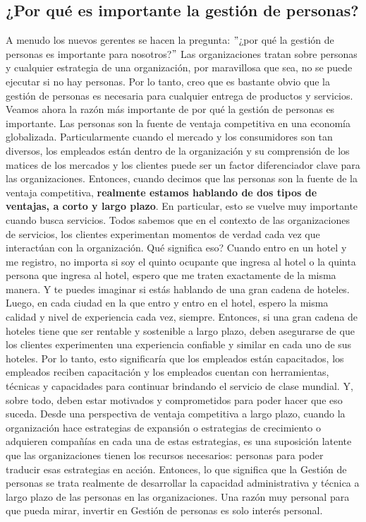 \documentclass[10pt]{book}
\begin{document}
\subsection{¿Por qué es importante la gestión de personas?}
A menudo los nuevos gerentes se hacen la pregunta: $"$¿por qué la gestión de personas es importante para nosotros?$"$ Las organizaciones tratan sobre personas y cualquier estrategia de una organización, por maravillosa que sea, no se puede ejecutar si no hay personas. Por lo tanto, creo que es bastante obvio que la gestión de personas es necesaria para cualquier entrega de productos y servicios.\\
Veamos ahora la razón más importante de por qué la gestión de personas es importante. Las personas son la fuente de ventaja competitiva en una economía globalizada. Particularmente cuando el mercado y los consumidores son tan diversos, los empleados están dentro de la organización y su comprensión de los matices de los mercados y los clientes puede ser un factor diferenciador clave para las organizaciones. Entonces, cuando decimos que las personas son la fuente de la ventaja competitiva, \textbf{realmente estamos hablando de dos tipos de ventajas, a corto y largo plazo}. En particular, esto se vuelve muy importante cuando busca servicios. Todos sabemos que en el contexto de las organizaciones de servicios, los clientes experimentan momentos de verdad cada vez que interactúan con la organización. Qué significa eso? Cuando entro en un hotel y me registro, no importa si soy el quinto ocupante que ingresa al hotel o la quinta persona que ingresa al hotel, espero que me traten exactamente de la misma manera. Y te puedes imaginar si estás hablando de una gran cadena de hoteles. Luego, en cada ciudad en la que entro y entro en el hotel, espero la misma calidad y nivel de experiencia cada vez, siempre. Entonces, si una gran cadena de hoteles tiene que ser rentable y sostenible a largo plazo, deben asegurarse de que los clientes experimenten una experiencia confiable y similar en cada uno de sus hoteles. Por lo tanto, esto significaría que los empleados están capacitados, los empleados reciben capacitación y los empleados cuentan con herramientas, técnicas y capacidades para continuar brindando el servicio de clase mundial. Y, sobre todo, deben estar motivados y comprometidos para poder hacer que eso suceda. Desde una perspectiva de ventaja competitiva a largo plazo, cuando la organización hace estrategias de expansión o estrategias de crecimiento o adquieren compañías en cada una de estas estrategias, es una suposición latente que las organizaciones tienen los recursos necesarios: personas para poder traducir esas estrategias en acción. Entonces, lo que significa que la Gestión de personas se trata realmente de desarrollar la capacidad administrativa y técnica a largo plazo de las personas en las organizaciones. Una razón muy personal para que pueda mirar, invertir en Gestión de personas es solo interés personal.\\
\end{document}
